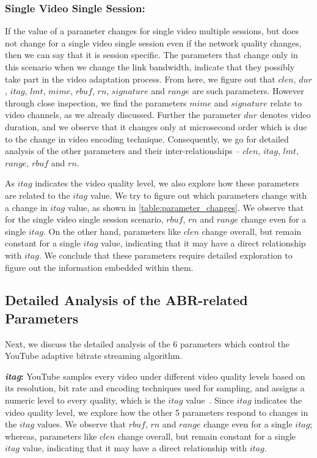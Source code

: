 \subsubsection{Single Video Single Session:} If the value of a parameter changes for single video multiple sessions, but does not change for a single video single session even if the network quality changes, then we can say that it is session specific. The parameters that change only in this scenario when we change the link bandwidth, indicate that they possibly take part in the video adaptation process. From here, we figure out that $clen$, $dur$, $itag$, $lmt$, $mime$, $rbuf$, $rn$, $signature$ and $range$ are such parameters. However through close inspection, we find the parameters $mime$ and $signature$ relate to video channels, as we already discussed. Further the parameter $dur$ denotes video duration, and we observe that it changes only at microsecond order which is due to the change in video encoding technique. Consequently, we go for detailed analysis of the other parameters and their inter-relationships -- $clen$, $itag$, $lmt$, $range$, $rbuf$ and $rn$.

As $itag$ indicates the video quality level, we also explore how these parameters are related to the $itag$ value. We try to figure out which parameters change with a change in $itag$ value, as shown in \tbl\ref{table:parameter_changes}. We observe that for the single video single session scenario, $rbuf$, $rn$ and $range$ change even for a single $itag$. On the other hand, parameters like $clen$ change overall, but remain constant for a single $itag$ value, indicating that it may have a direct relationship with $itag$. We conclude that these parameters require detailed exploration to figure out the information embedded within them.

\subsection{Detailed Analysis of the ABR-related Parameters}
Next, we discuss the detailed analysis of the $6$ parameters which control the YouTube adaptive bitrate streaming algorithm.

{\bf {\em itag}:} YouTube samples every video under different video quality levels based on its resolution, bit rate and encoding techniques used for sampling, and assigns a numeric level to every quality, which is the $itag$ value~\cite{itag}.
Since $itag$ indicates the video quality level, we explore how the other 5 parameters respond to changes in the $itag$ values.
We observe that $rbuf$, $rn$ and $range$ change even for a single $itag$; whereas, parameters like $clen$ change overall, but remain constant for a single $itag$ value, indicating that it may have a direct relationship with $itag$.

